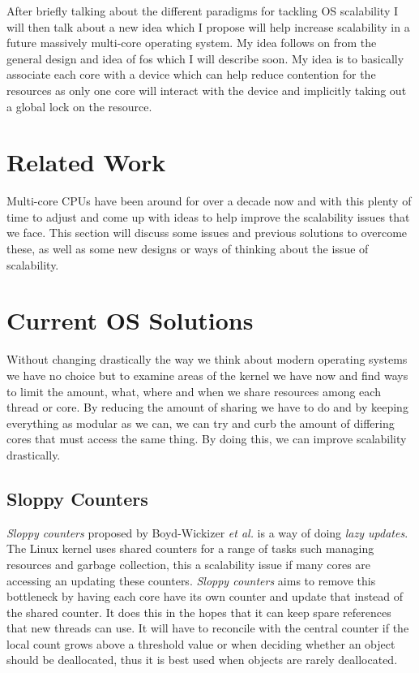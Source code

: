 \documentclass[journal]{IEEEtran}
\begin{document}
After briefly talking about the different paradigms for tackling OS scalability I will then talk about a new idea which I propose will help increase scalability in a future massively multi-core operating system. My idea follows on from the general design and idea of fos which I will describe soon. My idea is to basically associate each core with a device which can help reduce contention for the resources as only one core will interact with the device and implicitly taking out a global lock on the resource.

\section{Related Work}

Multi-core CPUs have been around for over a decade now and with this plenty of time to adjust and come up with ideas to help improve the scalability issues that we face. This section will discuss some issues and previous solutions to overcome these, as well as some new designs or ways of thinking about the issue of scalability. 

\section{Current OS Solutions}

Without changing drastically the way we think about modern operating systems we have no choice but to examine areas of the kernel we have now and find ways to limit the amount, what, where and when we share resources among each thread or core. By reducing the amount of sharing we have to do and by keeping everything as modular as we can, we can try and curb the amount of differing cores that must access the same thing. By doing this, we can improve scalability drastically. 

\subsection{Sloppy Counters}
\emph{Sloppy counters} proposed by Boyd-Wickizer \emph{et al.} is a way of doing \emph{lazy updates}. The Linux kernel uses shared counters for a range of tasks such managing resources and garbage collection, this a scalability issue if many cores are accessing an updating these counters. \emph{Sloppy counters} aims to remove this bottleneck by having each core have its own counter and update that instead of the shared counter. It does this in the hopes that it can keep spare references that new threads can use. It will have to reconcile with the central counter if the local count grows above a threshold value or when deciding whether an object should be deallocated, thus it is best used when objects are rarely deallocated.  
\end{document}
